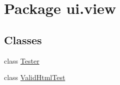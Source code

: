 \hypertarget{namespaceui_1_1view}{}\section{Package ui.\+view}
\label{namespaceui_1_1view}
\subsection*{Classes}
\begin{DoxyCompactItemize}
\item 
class \mbox{\hyperlink{classui_1_1view_1_1Tester}{Tester}}
\item 
class \mbox{\hyperlink{classui_1_1view_1_1ValidHtmlTest}{Valid\+Html\+Test}}
\end{DoxyCompactItemize}
